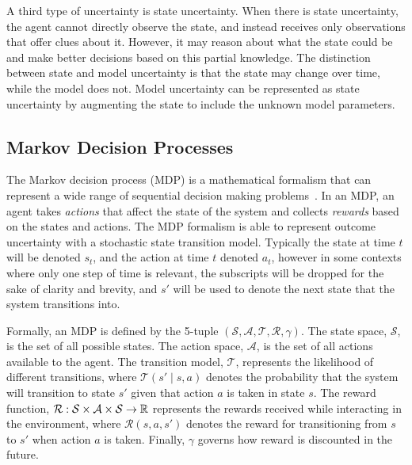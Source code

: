 A third type of uncertainty is state uncertainty.
When there is state uncertainty, the agent cannot directly observe the state, and instead receives only observations that offer clues about it.
However, it may reason about what the state could be and make better decisions based on this partial knowledge.
The distinction between state and model uncertainty is that the state may change over time, while the model does not.
Model uncertainty can be represented as state uncertainty by augmenting the state to include the unknown model parameters.

\subsection{Markov Decision Processes} \label{sec:mdps}

The Markov decision process (MDP) is a mathematical formalism that can represent a wide range of sequential decision making problems~\cite{DB:05,kochenderfer2015decision}. 
In an MDP, an agent takes \emph{actions} that affect the state of the system and collects \emph{rewards} based on the states and actions.
The MDP formalism is able to represent outcome uncertainty with a stochastic state transition model.
Typically the state at time $t$ will be denoted $s_t$, and the action at time $t$ denoted $a_t$, however in some contexts where only one step of time is relevant, the subscripts will be dropped for the sake of clarity and brevity, and $s'$ will be used to denote the next state that the system transitions into.

Formally, an MDP is defined by the 5-tuple $(\mathcal{S}, \mathcal{A}, \mathcal{T}, \mathcal{R}, \gamma)$.
The state space, $\mathcal{S}$, is the set of all possible states.
The action space, $\mathcal{A}$, is the set of all actions available to the agent.
The transition model, $\mathcal{T}$, represents the likelihood of different transitions, where $\mathcal{T}(s' \mid s, a)$ denotes the probability that the system will transition to state $s'$ given that action $a$ is taken in state $s$.
The reward function, $\mathcal{R}: \mathcal{S} \times \mathcal{A} \times \mathcal{S} \to \mathbb{R}$ represents the rewards received while interacting in the environment, where
$\mathcal{R}(s, a, s')$ denotes the reward for transitioning from $s$ to $s'$ when action $a$ is taken.
Finally, $\gamma$ governs how reward is discounted in the future.


